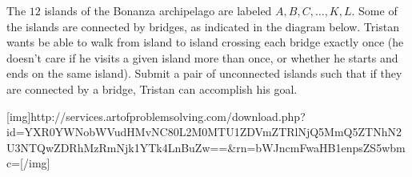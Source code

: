 The $12$ islands of the Bonanza archipelago are labeled $A,B,C,\dots,K,L$. Some of the islands are connected by bridges, as indicated in the diagram below. Tristan wants be able to walk from island to island crossing each bridge exactly once (he doesn't care if he visits a given island more than once, or whether he starts and ends on the same island). Submit a pair of unconnected islands such that if they are connected by a bridge, Tristan can accomplish his goal.

[img]http://services.artofproblemsolving.com/download.php?id=YXR0YWNobWVudHMvNC80L2M0MTU1ZDVmZTRlNjQ5MmQ5ZTNhN2U3NTQwZDRhMzRmNjk1YTk4LnBuZw==&rn=bWJncmFwaHB1enpsZS5wbmc=[/img]